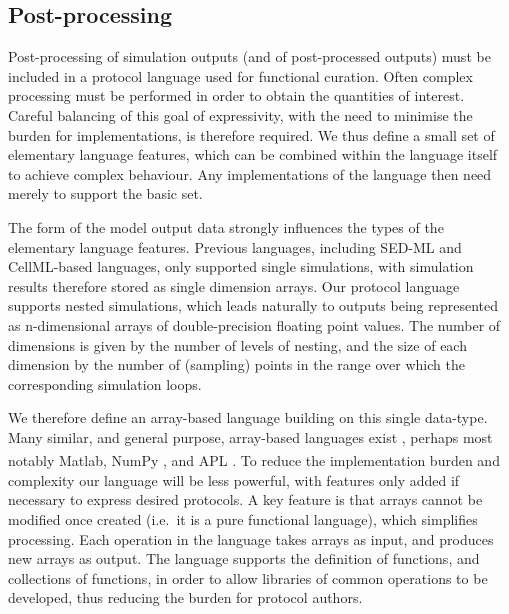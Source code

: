 \documentclass[preprint,authoryear,12pt]{elsarticle}
\newcommand{\Matlab}{{\sc Matlab}\textsuperscript{\textregistered}}
\begin{document}
\subsection{Post-processing}
\label{sec:proto-pp}

Post-processing of simulation outputs (and of post-processed outputs) must be included in a protocol language used for functional curation.
Often complex processing must be performed in order to obtain the quantities of interest.
Careful balancing of this goal of expressivity, with the need to minimise the burden for implementations, is therefore required.
We thus define a small set of elementary language features, which can be combined within the language itself to achieve complex behaviour.
Any implementations of the language then need merely to support the basic set.


The form of the model output data strongly influences the types of the elementary language features.
Previous languages, including SED-ML and CellML-based languages, only supported single simulations, with simulation results therefore stored as single dimension arrays.
Our protocol language supports nested simulations, which leads naturally to outputs being represented as n-dimensional arrays of double-precision floating point values.
The number of dimensions is given by the number of levels of nesting, and the size of each dimension by the number of (sampling) points in the range over which the corresponding simulation loops.


We therefore define an array-based language building on this single data-type.
Many similar, and general purpose, array-based languages exist \citep[e.g.][]{Scholz.03:Single,Jenkins.93:Nial,McGraw*.85:SISAL,Burke.96:J}, perhaps most notably \Matlab, NumPy \citep{Oliphant.07:Python}, and APL \citep{Iverson.62:APL}.
To reduce the implementation burden and complexity our language will be less powerful, with features only added if necessary to express desired protocols.
A key feature is that arrays cannot be modified once created (i.e.\ it is a pure functional language), which simplifies processing.
Each operation in the language takes arrays as input, and produces new arrays as output.
The language supports the definition of functions, and collections of functions, in order to allow libraries of common operations to be developed, thus reducing the burden for protocol authors.
\end{document}
